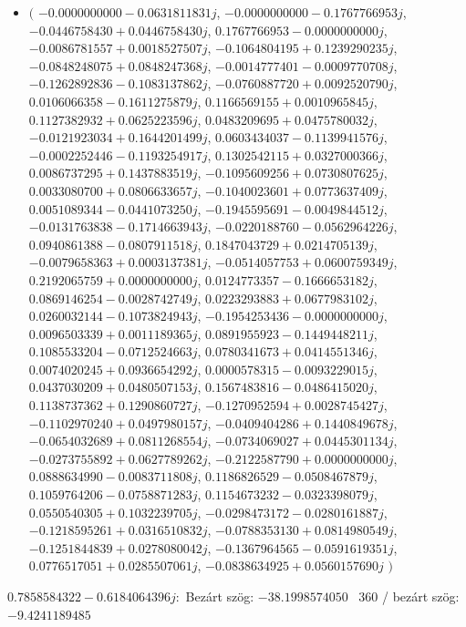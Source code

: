 \documentclass[14pt,a4paper]{article}
\begin{document}
\begin{itemize}
\item
$\big($
$-0.0000000000-0.0631811831j$, $-0.0000000000-0.1767766953j$, $-0.0446758430+0.0446758430j$, $0.1767766953-0.0000000000j$, $-0.0086781557+0.0018527507j$, $-0.1064804195+0.1239290235j$, $-0.0848248075+0.0848247368j$, $-0.0014777401-0.0009770708j$, $-0.1262892836-0.1083137862j$, $-0.0760887720+0.0092520790j$, $0.0106066358-0.1611275879j$, $0.1166569155+0.0010965845j$, $0.1127382932+0.0625223596j$, $0.0483209695+0.0475780032j$, $-0.0121923034+0.1644201499j$, $0.0603434037-0.1139941576j$, $-0.0002252446-0.1193254917j$, $0.1302542115+0.0327000366j$, $0.0086737295+0.1437883519j$, $-0.1095609256+0.0730807625j$, $0.0033080700+0.0806633657j$, $-0.1040023601+0.0773637409j$, $0.0051089344-0.0441073250j$, $-0.1945595691-0.0049844512j$, $-0.0131763838-0.1714663943j$, $-0.0220188760-0.0562964226j$, $0.0940861388-0.0807911518j$, $0.1847043729+0.0214705139j$, $-0.0079658363+0.0003137381j$, $-0.0514057753+0.0600759349j$, $0.2192065759+0.0000000000j$, $0.0124773357-0.1666653182j$, $0.0869146254-0.0028742749j$, $0.0223293883+0.0677983102j$, $0.0260032144-0.1073824943j$, $-0.1954253436-0.0000000000j$, $0.0096503339+0.0011189365j$, $0.0891955923-0.1449448211j$, $0.1085533204-0.0712524663j$, $0.0780341673+0.0414551346j$, $0.0074020245+0.0936654292j$, $0.0000578315-0.0093229015j$, $0.0437030209+0.0480507153j$, $0.1567483816-0.0486415020j$, $0.1138737362+0.1290860727j$, $-0.1270952594+0.0028745427j$, $-0.1102970240+0.0497980157j$, $-0.0409404286+0.1440849678j$, $-0.0654032689+0.0811268554j$, $-0.0734069027+0.0445301134j$, $-0.0273755892+0.0627789262j$, $-0.2122587790+0.0000000000j$, $0.0888634990-0.0083711808j$, $0.1186826529-0.0508467879j$, $0.1059764206-0.0758871283j$, $0.1154673232-0.0323398079j$, $0.0550540305+0.1032239705j$, $-0.0298473172-0.0280161887j$, $-0.1218595261+0.0316510832j$, $-0.0788353130+0.0814980549j$, $-0.1251844839+0.0278080042j$, $-0.1367964565-0.0591619351j$, $0.0776517051+0.0285507061j$, $-0.0838634925+0.0560157690j$
$\big)$
\end{itemize}
$0.7858584322-0.6184064396j$:\
Bezárt szög: $-38.1998574050$ \
360 / bezárt szög: $-9.4241189485$\
\end{document}
